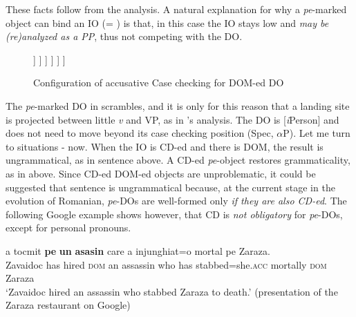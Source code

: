 \documentclass[output=paper,colorlinks,citecolor=brown,nonflat]{langsci/langscibook}
\begin{document}
These facts follow from the analysis. A natural explanation for why a \textit{pe}{}-marked object can bind an IO (= ) is that, in this case the IO stays low and \textit{may be (re)analyzed as a PP}, thus not competing with the DO.

\begin{figure}%
	\begin{forest}
		[\textit{v}P
			[\textit{v}\\
				 {[}\textit{u}Case:\_\_{]}
			]
			[${\alpha}$P
				[KP\textsubscript{DO}\\
					 {[}\textit{i}Pers{]}\\
					 {[}\textit{u}Case:\textsc{acc}{]}
				]
				[${\alpha}$P
					[${\alpha}$'
					]
					[VP
						[<KP\textsubscript{DO}>
						]
						[V'
							[V]
							[PP
								[P]
								[DP\textsubscript{IO}]
							]
						]
					]
				]
			]
		]
	\end{forest}
	\caption{\label{fig:cornilescu:11} Configuration of accusative Case checking for DOM-ed DO}
\end{figure}


The \textit{pe}{}-marked DO in  scrambles, and it is only for this reason that a landing site is projected between little \textit{v} and VP, as in \citeauthor{López2012}’s analysis. The DO is [\textit{i}Person] and does not need to move beyond its case checking position (Spec, ${\alpha}$P). Let me turn to situations - now. When the IO is CD-ed and there is DOM, the result is ungrammatical, as in sentence  above. A CD-ed \textit{pe}{}-object restores grammaticality, as in  above. Since CD-ed DOM-ed objects are unproblematic, it could be suggested that sentence  is ungrammatical because, at the current stage in the evolution of Romanian, \textit{pe}{}-DOs are well-formed only \textit{if they are also CD-ed}. The following Google example shows however, that CD is \textit{not obligatory} for \textit{pe}{}-DOs, except for personal pronouns.

\ea%
   \label{ex:cornilescu:31}
    {a} {tocmit} \textbf{pe} \textbf{un} \textbf{asasin} {care} {a} {injunghiat=o} {mortal} {pe} {Zaraza}.\\
       Zavaidoc has hired \textsc{dom} an assassin who has stabbed=she.\textsc{acc} mortally \textsc{dom} Zaraza\\
   \glt ‘Zavaidoc hired an assassin who stabbed Zaraza to death.’ (presentation of the Zaraza restaurant on Google)
   \z
\end{document}
